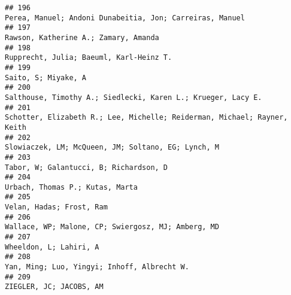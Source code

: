 \documentclass[
  english,
  man]{apa6}
\begin{document}
\begin{verbatim}
## 196                                                                                                                                 Perea, Manuel; Andoni Dunabeitia, Jon; Carreiras, Manuel
## 197                                                                                                                                                     Rawson, Katherine A.; Zamary, Amanda
## 198                                                                                                                                                  Rupprecht, Julia; Baeuml, Karl-Heinz T.
## 199                                                                                                                                                                      Saito, S; Miyake, A
## 200                                                                                                                             Salthouse, Timothy A.; Siedlecki, Karen L.; Krueger, Lacy E.
## 201                                                                                                                 Schotter, Elizabeth R.; Lee, Michelle; Reiderman, Michael; Rayner, Keith
## 202                                                                                                                                       Slowiaczek, LM; McQueen, JM; Soltano, EG; Lynch, M
## 203                                                                                                                                                   Tabor, W; Galantucci, B; Richardson, D
## 204                                                                                                                                                          Urbach, Thomas P.; Kutas, Marta
## 205                                                                                                                                                                 Velan, Hadas; Frost, Ram
## 206                                                                                                                                       Wallace, WP; Malone, CP; Swiergosz, MJ; Amberg, MD
## 207                                                                                                                                                                   Wheeldon, L; Lahiri, A
## 208                                                                                                                                              Yan, Ming; Luo, Yingyi; Inhoff, Albrecht W.
## 209                                                                                                                                                                  ZIEGLER, JC; JACOBS, AM

\end{verbatim}
\end{document}
